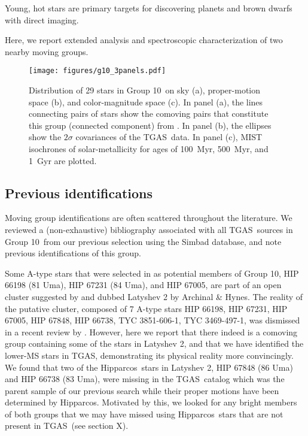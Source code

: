 \documentclass[modern,letterpaper]{aastex61}
\newcommand{\acronym}[1]{{\small{#1}}}
\newcommand{\hipparcos}{Hipparcos}
\newcommand{\tgas}{\acronym{TGAS}}
\newcommand{\groupTen}{Group 10}
\newcommand{\todo}[1]{{\color{crimson}#1}}
\begin{document}
Young, hot stars are primary targets for discovering planets and brown dwarfs
with direct imaging.

Here, we report extended analysis and spectroscopic characterization of two
nearby moving groups.


\begin{figure}[ht]
  \centering
  \texttt{[image: figures/g10\_3panels.pdf]}
  \caption{\label{fig:g10_3panels}
    Distribution of 29 stars in \groupTen\ on sky (a),
    proper-motion space (b), and color-magnitude space (c).
    In panel (a), the lines connecting pairs of stars show the comoving pairs
    that constitute this group (connected component) from
    \citet{2017AJ....153..257O}.
    In panel (b), the ellipses show the $2\sigma$ covariances of the \tgas\
    data.
    In panel (c), MIST isochrones of solar-metallicity for ages of 100~Myr,
    500~Myr, and 1~Gyr are plotted.
  }
\end{figure}


\subsection{Previous identifications}
\label{subsec:history}

Moving group identifications are often scattered throughout the literature. We
reviewed a (non-exhaustive) bibliography associated with all \tgas\ sources in
\groupTen\ from our previous selection \citep{2017AJ....153..257O} using the
Simbad database, and note previous identifications of this group.

Some A-type stars that were selected in \citet{2017AJ....153..257O} as potential
members of \groupTen,
HIP 66198 (81 Uma), HIP 67231 (84 Uma), and HIP 67005, are part of an open cluster
suggested by \citet{1977ATsir.969....7L} and dubbed Latyshev 2 by Archinal \& Hynes.
The reality of the putative cluster, composed of 7 A-type stars
HIP 66198,
HIP 67231,
HIP 67005,
HIP 67848,
HIP 66738,
TYC 3851-606-1,
TYC 3469-497-1,
was dismissed in a recent review by \citet{2016IAUS..314...21M}.
However, here we report that there indeed is a comoving group containing
some of the stars in Latyshev 2, and that we have identified the lower-MS stars
in \tgas, demonstrating its physical reality more convincingly.
We found that two of the \hipparcos\ stars in Latyshev 2,
HIP 67848 (86 Uma) and HIP 66738 (83 Uma),
were missing in the \tgas\ catalog which was the parent sample of our previous search while
their proper motions have been determined by \hipparcos.
Motivated by this, we looked for any bright members of both groups that we
may have missed using \hipparcos\ stars that are not present in \tgas\ (\todo{see section X}).
\end{document}
